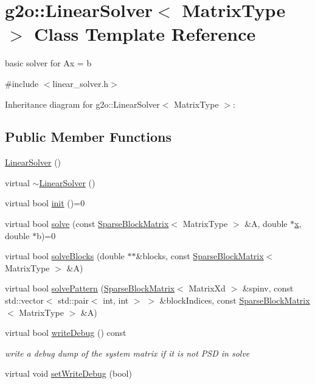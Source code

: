 \hypertarget{classg2o_1_1LinearSolver}{}\section{g2o\+:\+:Linear\+Solver$<$ Matrix\+Type $>$ Class Template Reference}
\label{classg2o_1_1LinearSolver}


basic solver for Ax = b  




{\ttfamily \#include $<$linear\+\_\+solver.\+h$>$}



Inheritance diagram for g2o\+:\+:Linear\+Solver$<$ Matrix\+Type $>$\+:
\subsection*{Public Member Functions}
\begin{DoxyCompactItemize}
\item 
\hyperlink{classg2o_1_1LinearSolver_a741928aa64f4b6416c9990892e3ede7a}{Linear\+Solver} ()
\item 
virtual \hyperlink{classg2o_1_1LinearSolver_a5157e1221534fae13989c8443adab1ec}{$\sim$\+Linear\+Solver} ()
\item 
virtual bool \hyperlink{classg2o_1_1LinearSolver_aebd961a94ef6de1bc66d2ca41dd2b17b}{init} ()=0
\item 
virtual bool \hyperlink{classg2o_1_1LinearSolver_aa44b40826d50203c8ce2ff258c34e030}{solve} (const \hyperlink{classg2o_1_1SparseBlockMatrix}{Sparse\+Block\+Matrix}$<$ Matrix\+Type $>$ \&A, double $\ast$\hyperlink{sparse__helper_8cpp_af88b946fb90d5f08b5fb740c70e98c10}{x}, double $\ast$b)=0
\item 
virtual bool \hyperlink{classg2o_1_1LinearSolver_a252e3658b3ba0c3577c33f846c514535}{solve\+Blocks} (double $\ast$$\ast$\&blocks, const \hyperlink{classg2o_1_1SparseBlockMatrix}{Sparse\+Block\+Matrix}$<$ Matrix\+Type $>$ \&A)
\item 
virtual bool \hyperlink{classg2o_1_1LinearSolver_adc74484f72bbe373622581fd597c1be3}{solve\+Pattern} (\hyperlink{classg2o_1_1SparseBlockMatrix}{Sparse\+Block\+Matrix}$<$ Matrix\+Xd $>$ \&spinv, const std\+::vector$<$ std\+::pair$<$ int, int $>$ $>$ \&block\+Indices, const \hyperlink{classg2o_1_1SparseBlockMatrix}{Sparse\+Block\+Matrix}$<$ Matrix\+Type $>$ \&A)
\item 
virtual bool \hyperlink{classg2o_1_1LinearSolver_a8b6a84bd88f1bbc13d2c80c3a14d4693}{write\+Debug} () const 
\begin{DoxyCompactList}\small\item\em write a debug dump of the system matrix if it is not P\+SD in solve \end{DoxyCompactList}\item 
virtual void \hyperlink{classg2o_1_1LinearSolver_a969c406ccacc38705b2a88f5ed23cb9a}{set\+Write\+Debug} (bool)
\end{DoxyCompactItemize}


